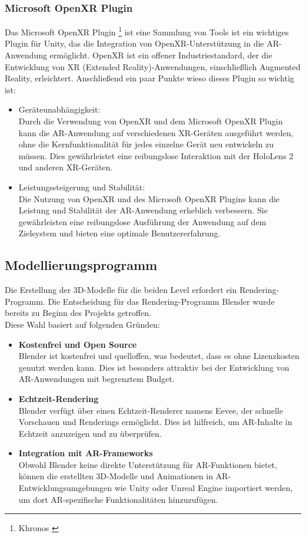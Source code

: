 \subsubsection{Microsoft OpenXR Plugin}
Das Microsoft OpenXR Plugin \footnote{Khronos \cite{OpenXR}} ist eine Sammlung von Tools ist ein wichtiges Plugin für Unity, das die Integration von OpenXR-Unterstützung in
die AR-Anwendung ermöglicht. OpenXR ist ein offener Industriestandard, der die Entwicklung von XR
(Extended Reality)-Anwendungen, einschließlich Augmented Reality, erleichtert. Anschließend ein paar Punkte wieso
dieses Plugin so wichtig ist:
\begin{itemize}
    \item Geräteunabhängigkeit: \\
    Durch die Verwendung von OpenXR und dem Microsoft OpenXR Plugin kann die AR-Anwendung auf verschiedenen
    XR-Geräten ausgeführt werden, ohne die Kernfunktionalität für jedes einzelne Gerät neu entwickeln zu müssen.
    Dies gewährleistet eine reibungslose Interaktion mit der HoloLens 2 und anderen XR-Geräten.
    \item Leistungssteigerung und Stabilität: \\
    Die Nutzung von OpenXR und des Microsoft OpenXR Plugins kann die
    Leistung und Stabilität der AR-Anwendung erheblich verbessern. Sie gewährleisten eine reibungslose Ausführung
    der Anwendung auf dem Zielsystem und bieten eine optimale Benutzererfahrung.
\end{itemize}

\subsection{Modellierungsprogramm}

Die Erstellung der 3D-Modelle für die beiden Level erfordert ein Rendering-Programm. Die Entscheidung für das
Rendering-Programm Blender wurde bereits zu Beginn des Projekts getroffen. \\
Diese Wahl basiert auf folgenden Gründen:
\begin{itemize}
    \item \textbf{Kostenfrei und Open Source}\\
    Blender ist kostenfrei und quelloffen, was bedeutet, dass es ohne Lizenzkosten genutzt werden kann. Dies ist
    besonders attraktiv bei der Entwicklung von AR-Anwendungen mit begrenztem Budget.
    \item \textbf{Echtzeit-Rendering}\\
    Blender verfügt über einen Echtzeit-Renderer namens Eevee, der schnelle Vorschauen
    und Renderings ermöglicht. Dies ist hilfreich, um AR-Inhalte in Echtzeit anzuzeigen und zu überprüfen.

    \item \textbf{Integration mit AR-Frameworks}\\
    Obwohl Blender keine direkte Unterstützung für AR-Funktionen bietet, können die erstellten 3D-Modelle und
    Animationen in AR-Entwicklungsumgebungen wie Unity oder Unreal Engine importiert werden, um dort
    AR-spezifische Funktionalitäten hinzuzufügen.
\end{itemize}

